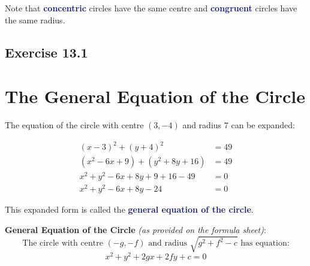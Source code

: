\documentclass[
  11pt,
  openany]{book}
\begin{document}
Note that \textcolor{MidnightBlue}{\textbf{concentric}} circles have the same centre and \textcolor{MidnightBlue}{\textbf{congruent}} circles have the same radius.

\pagebreak

\subsection*{Exercise 13.1}\label{exercise-13.1}

\newpage

\section{The General Equation of the Circle}\label{the-general-equation-of-the-circle}

\vspace{-0.5cm}

The equation of the circle with centre \((3,-4)\) and radius \(7\) can be expanded:

\vspace{-0.7cm}

\begin{align*}
    (x-3)^2+(y+4)^2&=49\\[0.5em]
    (x^2-6x+9)+(y^2+8y+16)&=49\\[0.5em]
    x^2+y^2-6x+8y+9+16-49&=0\\[0.5em]
    x^2+y^2-6x+8y-24&=0
\end{align*}

\vspace{-0.5cm}

This expanded form is called the \textcolor{MidnightBlue}{\textbf{general equation of the circle}}.

\vspace{-0.3cm}

\begin{center}
\begin{tcolorbox}[colback=red!5,colframe=red!70!black]
\centering
\textbf{General Equation of the Circle} \textit{(as provided on the formula sheet)}:
\begin{equation*}
    \text{The circle with centre }(-g,-f)\text{ and radius }\sqrt{g^2+f^2-c}\text{ has equation:}
\end{equation*}
\vspace{-0.6cm}
\begin{equation*}
    x^2+y^2+2gx+2fy+c=0
\end{equation*}

\end{tcolorbox}
\end{center}
\end{document}
